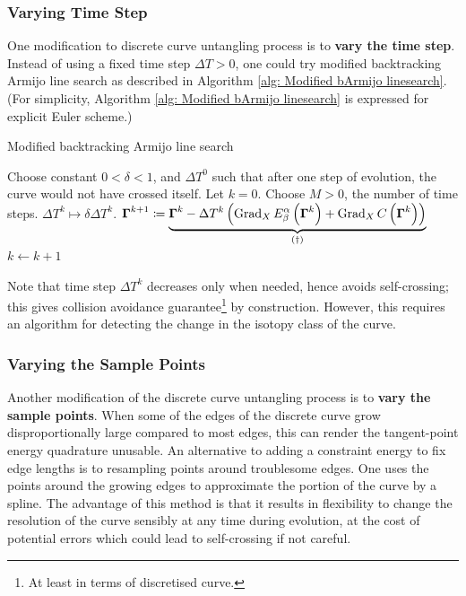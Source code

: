 \documentclass[../dissertation.tex]{subfiles}
\begin{document}
\subsubsection{Varying Time Step}
One modification to discrete curve untangling process is to \textbf{vary the time step}.
Instead of using a fixed time step $\Delta T > 0$, one could try modified backtracking Armijo line search\cite{doi:10.1137/1.9781611971200.ch6} as described in Algorithm \ref{alg: Modified bArmijo linesearch}.
(For simplicity, Algorithm \ref{alg: Modified bArmijo linesearch} is expressed for explicit Euler scheme.)
\begin{algorithm}[tbp]
    \caption{Modified backtracking Armijo line search}
    \label{alg: Modified bArmijo linesearch}
    \begin{algorithmic}
        \State Choose constant $0 < \delta < 1$, and $\Delta T^0$ such that after one step of evolution, the curve would not have crossed itself.
        \State Let $k = 0$.
        \State Choose $M > 0$, the number of time steps.
            \State $\Delta T^k \mapsto \delta \Delta T^k$.
            \Else
            \State $\boldsymbol{\Gamma}^{k+1} \coloneqq \underbrace{\boldsymbol{\Gamma}^k - \Delta T^k \left( \operatorname{Grad}_X E_{\beta}^{\alpha} \left( \boldsymbol{\Gamma}^k \right) + \operatorname{Grad}_X C \left( \boldsymbol{\Gamma}^k \right)\right)}_{(\dag)}$
            \State $k \leftarrow k + 1$
            \EndIf
        \EndWhile
    \end{algorithmic}
\end{algorithm}
Note that time step $\Delta T^k$ decreases only when needed, hence avoids self-crossing;
this gives collision avoidance guarantee\footnote{At least in terms of discretised curve.} by construction\cite{YSC2021}.
However, this requires an algorithm for detecting the change in the isotopy class of the curve.

\subsubsection{Varying the Sample Points}
Another modification of the discrete curve untangling process is to \textbf{vary the sample points}.
When some of the edges of the discrete curve grow disproportionally large compared to most edges,
this can render the tangent-point energy quadrature unusable.
An alternative to adding a constraint energy to fix edge lengths is to resampling points around troublesome edges.
One uses the points around the growing edges to approximate the portion of the curve by a spline. The advantage of this method is that it results in flexibility to change the resolution of the curve sensibly at any time during evolution, at the cost of potential errors which could lead to self-crossing if not careful.
\end{document}
